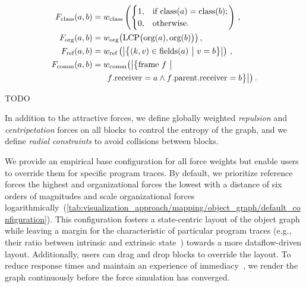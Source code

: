 \begin{equation}
	\begin{split}
		F_{\text{class}}(a, b) &= w_{\text{class}}\left(\begin{cases}1, & \text{if $\text{class}(a) = \text{class}(b)$;} \\ 0, & \text{otherwise}.\end{cases}\right) \,, \\
		F_{\text{org}}(a, b) &= w_{\text{org}}\bigl(\text{LCP}\bigl(\text{org}(a), \text{org}(b)\bigr)\bigr) \,, \\
		F_{\text{ref}}(a, b) &= w_{\text{ref}}\left(\left|\bigl\{ (k, v) \in \text{fields}(a) ~\middle\vert~ v = b \bigr\}\right|\right) \,, \\
		F_{\text{comm}}(a, b) &= w_{\text{comm}}\big(\big|\big\{\text{frame }f ~\big\vert \\
			& \hphantom{= w} \text{$f$.receiver} = a \wedge \text{$f$.parent.receiver} = b\big\}\big|\big) \, .
	\end{split}
\end{equation}
\addtocounter{footnote}{-1}

\begin{table}
	\centering
	\caption{TODO}
	\label{tab:visualization_approach/mapping/object_graph/default_configuration}
	\begin{threeparttable}
		\centering
		{\footnotesize
		}
	\end{threeparttable}
\end{table}

In addition to the attractive forces, we define globally weighted \emph{repulsion} and \emph{centripetation} forces on all blocks to control the entropy of the graph, and we define \emph{radial constraints} to avoid collisions between blocks.

We provide an empirical base configuration for all force weights but enable users to override them for specific program traces.
By default, we prioritize reference forces the highest and organizational forces the lowest with a distance of six orders of magnitudes and scale organizational forces logarithmically~(\cref{tab:visualization_approach/mapping/object_graph/default_configuration}).
This configuration fosters a state-centric layout of the object graph while leaving a margin for the characteristic of particular program traces (e.g., their ratio between intrinsic and extrinsic state~\cite[p. 218ff]{gamma1994design}) towards a more dataflow-driven layout. %
Additionally, users can drag and drop blocks to override the layout.
To reduce response times and maintain an experience of immediacy~\cites[chap. 11]{shneiderman2005designing}{ungar1997debugging}, we render the graph continuously before the force simulation has converged.

